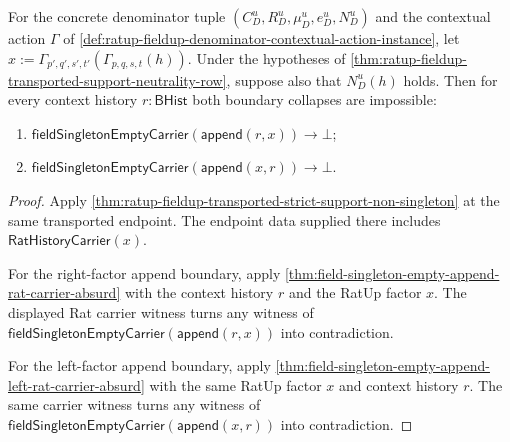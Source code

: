 \begin{theorem}
\label{thm:ratup-fieldup-transported-strict-support-contextual-singleton-exclusion}
For the concrete denominator tuple $(C_D^u,R_D^u,\mu_D^u,e_D^u,N_D^u)$ and the
contextual action $\Gamma$ of
\autoref{def:ratup-fieldup-denominator-contextual-action-instance}, let
$x:=\Gamma_{p',q',s',t'}(\Gamma_{p,q,s,t}(h))$. Under the hypotheses of
\autoref{thm:ratup-fieldup-transported-support-neutrality-row}, suppose also
that $N_D^u(h)$ holds. Then for every context history $r:\mathsf{BHist}$ both
boundary collapses are impossible:
\begin{enumerate}
  \item $\mathsf{fieldSingletonEmptyCarrier}(\mathsf{append}(r,x))\to\bot$;
  \item $\mathsf{fieldSingletonEmptyCarrier}(\mathsf{append}(x,r))\to\bot$.
\end{enumerate}
\end{theorem}
\begin{proof}
Apply
\autoref{thm:ratup-fieldup-transported-strict-support-non-singleton} at the
same transported endpoint. The endpoint data supplied there includes
$\mathsf{RatHistoryCarrier}(x)$.

For the right-factor append boundary, apply
\autoref{thm:field-singleton-empty-append-rat-carrier-absurd} with the context
history $r$ and the RatUp factor $x$. The displayed Rat carrier witness turns
any witness of
$\mathsf{fieldSingletonEmptyCarrier}(\mathsf{append}(r,x))$ into
contradiction.

For the left-factor append boundary, apply
\autoref{thm:field-singleton-empty-append-left-rat-carrier-absurd} with the
same RatUp factor $x$ and context history $r$. The same carrier witness turns
any witness of $\mathsf{fieldSingletonEmptyCarrier}(\mathsf{append}(x,r))$
into contradiction.
\end{proof}

